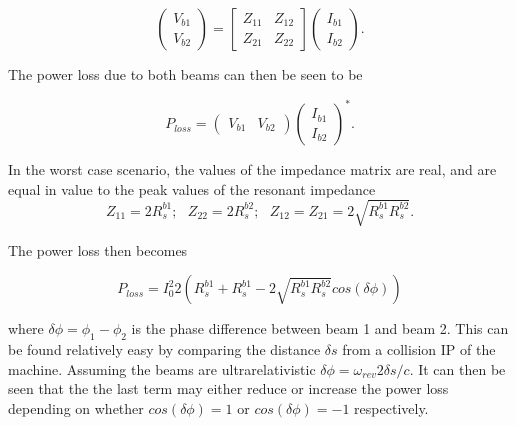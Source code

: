 \begin{equation}
\begin{pmatrix}
V_{b1} \\
V_{b2}
\end{pmatrix}
=
\begin{bmatrix}
Z_{11} & Z_{12} \\
Z_{21} & Z_{22}
\end{bmatrix}
\begin{pmatrix}
I_{b1} \\
I_{b2}
\end{pmatrix}.
\end{equation}

The power loss due to both beams can then be seen to be

\begin{equation}
P_{loss} = \begin{pmatrix}
V_{b1} & V_{b2}
\end{pmatrix}
\begin{pmatrix}
I_{b1} \\
I_{b2}
\end{pmatrix}^{*}.
\end{equation}

In the worst case scenario, the values of the impedance matrix are real, and are equal in value to the peak values of the resonant impedance
\begin{equation}
Z_{11} = 2R^{b1}_{s};\text{    } Z_{22} = 2R^{b2}_{s};\text{    }  Z_{12} = Z_{21} = 2 \sqrt{R^{b1}_{s}R^{b2}_{s}}.
\end{equation}

The power loss then becomes

\begin{equation}
P_{loss} = I_{0}^{2} 2 \left( R_{s}^{b1} +  R_{s}^{b1} - 2\sqrt{R^{b1}_{s}R^{b2}_{s}} cos \left( \delta \phi \right) \right)
\end{equation}

where $\delta \phi = \phi_{1} - \phi_{2}$ is the phase difference between beam 1 and beam 2. This can be found relatively easy by comparing the distance $\delta s$ from a collision IP of the machine. Assuming the beams are ultrarelativistic $\delta \phi = \omega_{rev} 2  \delta s /c$. It can then be seen that the the last term may either reduce or increase the power loss depending on whether $cos\left( \delta \phi \right) = 1$ or $cos\left( \delta \phi \right) = -1$ respectively.

